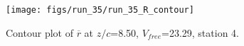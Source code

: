 \begin{figure}[H]
\centering
\texttt{[image: figs/run\_35/run\_35\_R\_contour]}
\caption{Contour plot of $\overline{r}$ at $z/c$=8.50, $V_{free}$=23.29, station 4.}
\label{fig:run_35_R_contour}
\end{figure}


